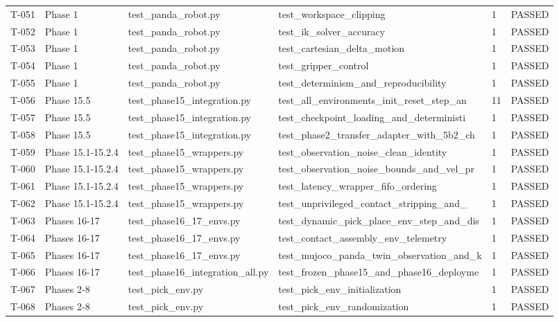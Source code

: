 \documentclass[11pt,a4paper,oneside]{book}
\begin{document}
\begin{longtable}{l l l l l l}
T-051 & Phase 1 & test\_panda\_robot.py & test\_workspace\_clipping & 1 & PASSED \\
T-052 & Phase 1 & test\_panda\_robot.py & test\_ik\_solver\_accuracy & 1 & PASSED \\
T-053 & Phase 1 & test\_panda\_robot.py & test\_cartesian\_delta\_motion & 1 & PASSED \\
T-054 & Phase 1 & test\_panda\_robot.py & test\_gripper\_control & 1 & PASSED \\
T-055 & Phase 1 & test\_panda\_robot.py & test\_determinism\_and\_reproducibility & 1 & PASSED \\
T-056 & Phase 15.5 & test\_phase15\_integration.py & test\_all\_environments\_init\_reset\_step\_an & 11 & PASSED \\
T-057 & Phase 15.5 & test\_phase15\_integration.py & test\_checkpoint\_loading\_and\_deterministi & 1 & PASSED \\
T-058 & Phase 15.5 & test\_phase15\_integration.py & test\_phase2\_transfer\_adapter\_with\_5b2\_ch & 1 & PASSED \\
T-059 & Phase 15.1-15.2.4 & test\_phase15\_wrappers.py & test\_observation\_noise\_clean\_identity & 1 & PASSED \\
T-060 & Phase 15.1-15.2.4 & test\_phase15\_wrappers.py & test\_observation\_noise\_bounds\_and\_vel\_pr & 1 & PASSED \\
T-061 & Phase 15.1-15.2.4 & test\_phase15\_wrappers.py & test\_latency\_wrapper\_fifo\_ordering & 1 & PASSED \\
T-062 & Phase 15.1-15.2.4 & test\_phase15\_wrappers.py & test\_unprivileged\_contact\_stripping\_and\_ & 1 & PASSED \\
T-063 & Phases 16-17 & test\_phase16\_17\_envs.py & test\_dynamic\_pick\_place\_env\_step\_and\_dis & 1 & PASSED \\
T-064 & Phases 16-17 & test\_phase16\_17\_envs.py & test\_contact\_assembly\_env\_telemetry & 1 & PASSED \\
T-065 & Phases 16-17 & test\_phase16\_17\_envs.py & test\_mujoco\_panda\_twin\_observation\_and\_k & 1 & PASSED \\
T-066 & Phases 16-17 & test\_phase16\_integration\_all.py & test\_frozen\_phase15\_and\_phase16\_deployme & 1 & PASSED \\
T-067 & Phases 2-8 & test\_pick\_env.py & test\_pick\_env\_initialization & 1 & PASSED \\
T-068 & Phases 2-8 & test\_pick\_env.py & test\_pick\_env\_randomization & 1 & PASSED \\

\end{longtable}
\end{document}
